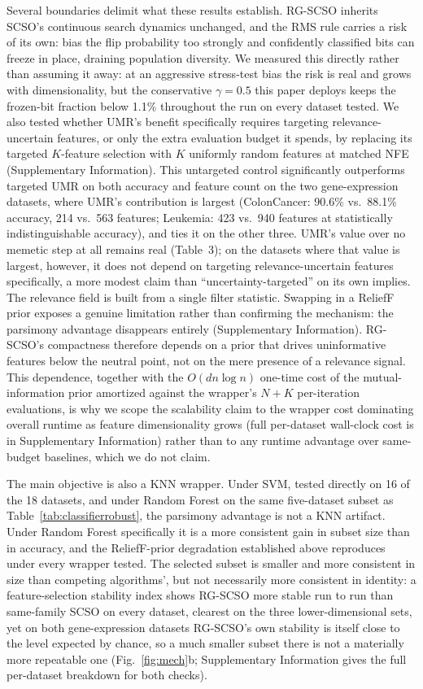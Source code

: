 \documentclass[iicol,sn-basic,pdflatex]{sn-jnl}
\begin{document}
Several boundaries delimit what these results establish. RG-SCSO inherits
SCSO's continuous search dynamics unchanged, and the RMS rule carries a risk
of its own: bias the flip probability too strongly and confidently classified
bits can freeze in place, draining population diversity. We measured this
directly rather than assuming it away: at an aggressive stress-test bias the
risk is real and grows with dimensionality, but the conservative $\gamma=0.5$
this paper deploys keeps the frozen-bit fraction below
1.1\% throughout
the run on every dataset tested. We also tested whether UMR's benefit
specifically requires targeting relevance-uncertain features, or only the
extra evaluation budget it spends, by replacing its targeted $K$-feature
selection with $K$ uniformly random features at matched NFE (Supplementary
Information). This untargeted control significantly outperforms targeted
UMR on both accuracy and feature count on the two gene-expression datasets,
where UMR's contribution is largest (ColonCancer: 90.6\% vs.\ 88.1\%
accuracy, 214 vs.\ 563 features; Leukemia: 423 vs.\ 940 features at
statistically indistinguishable accuracy), and ties it on the other three.
UMR's value over no memetic step at all remains real (Table~3); on the
datasets where that value is largest, however, it does not depend on
targeting relevance-uncertain features specifically, a more modest claim
than ``uncertainty-targeted'' on its own implies. The relevance field is
built from a single filter statistic. Swapping in a ReliefF prior exposes a
genuine limitation rather than confirming the mechanism: the parsimony
advantage disappears entirely (Supplementary Information). RG-SCSO's
compactness therefore depends on a prior that drives uninformative features
below the neutral point, not on the mere presence of a relevance signal. This dependence, together with the
$O(dn\log n)$ one-time cost of the mutual-information prior amortized
against the wrapper's $N+K$ per-iteration evaluations, is why we scope the
scalability claim to the wrapper cost dominating overall runtime as feature
dimensionality grows (full per-dataset wall-clock cost is in Supplementary
Information) rather than to any runtime advantage over same-budget
baselines, which we do not claim.

The main
objective is also a KNN wrapper. Under SVM, tested directly on
16 of the 18 datasets, and under Random Forest on
the same five-dataset subset as Table~\ref{tab:classifierrobust}, the
parsimony advantage is not a KNN artifact. Under Random Forest specifically it
is a more consistent gain in subset size than in accuracy, and the
ReliefF-prior degradation established above reproduces under every wrapper
tested. The selected subset is smaller and
more consistent in size than competing algorithms', but not necessarily
more consistent in identity: a feature-selection stability index shows
RG-SCSO more stable run to run than same-family SCSO on every dataset,
clearest on the three lower-dimensional sets, yet on both gene-expression
datasets RG-SCSO's own stability is itself close to the level expected by
chance, so a much smaller subset there is not a materially more repeatable
one (Fig.~\ref{fig:mech}b; Supplementary Information gives the full
per-dataset breakdown for both checks).
\end{document}
